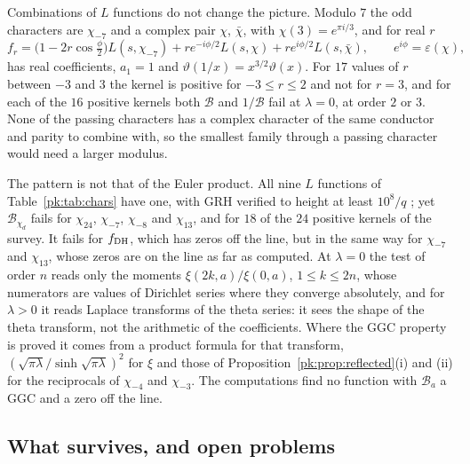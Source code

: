 Combinations of $L$ functions do not change the picture. Modulo $7$ the odd characters are $\chi_{-7}$ and a complex pair $\chi$, $\bar\chi$, with $\chi(3)=e^{\pi i/3}$, and for real $r$
\[
f_r=\big(1-2r\cos\tfrac\phi2\big)L(s,\chi_{-7})+re^{-i\phi/2}L(s,\chi)+re^{i\phi/2}L(s,\bar\chi),\qquad e^{i\phi}=\varepsilon(\chi),
\]
has real coefficients, $a_1=1$ and $\vartheta(1/x)=x^{3/2}\vartheta(x)$. For $17$ values of $r$ between $-3$ and $3$ the kernel is positive for $-3\le r\le2$ and not for $r=3$, and for each of the $16$ positive kernels both $\mathcal B$ and $1/\mathcal B$ fail at $\lambda=0$, at order $2$ or $3$. None of the passing characters has a complex character of the same conductor and parity to combine with, so the smallest family through a passing character would need a larger modulus.

The pattern is not that of the Euler product. All nine $L$ functions of Table~\ref{pk:tab:chars} have one, with GRH verified to height at least $10^8/q$ \cite{Platt16}; yet $\mathcal B_{\chi_d}$ fails for $\chi_{24}$, $\chi_{-7}$, $\chi_{-8}$ and $\chi_{13}$, and for $18$ of the $24$ positive kernels of the survey. It fails for $f_{\rm DH}$, which has zeros off the line, but in the same way for $\chi_{-7}$ and $\chi_{13}$, whose zeros are on the line as far as computed. At $\lambda=0$ the test of order $n$ reads only the moments $\xi(2k,a)/\xi(0,a)$, $1\le k\le2n$, whose numerators are values of Dirichlet series where they converge absolutely, and for $\lambda>0$ it reads Laplace transforms of the theta series: it sees the shape of the theta transform, not the arithmetic of the coefficients. Where the GGC property is proved it comes from a product formula for that transform, $(\sqrt{\pi\lambda}/\sinh\sqrt{\pi\lambda})^2$ for $\xi$ and those of Proposition~\ref{pk:prop:reflected}(i) and (ii) for the reciprocals of $\chi_{-4}$ and $\chi_{-3}$. The computations find no function with $\mathcal B_a$ a GGC and a zero off the line.

\subsection{What survives, and open problems}\label{pk:sec:assess}

